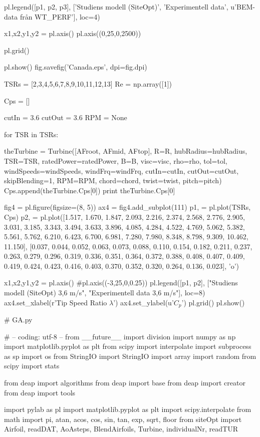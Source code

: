 \begin{pythoncode}
pl.legend([p1, p2, p3], ['Studiens modell (SiteOpt)', 'Experimentell data', u'BEM-data från WT_PERF'], loc=4)

x1,x2,y1,y2 = pl.axis()
pl.axis((0,25,0,2500))

pl.grid()


pl.show()
fig.savefig('Canada.eps', dpi=fig.dpi)


TSRs = [2,3,4,5,6,7,8,9,10,11,12,13] 
Re = np.array([1])

Cps = []

cutIn = 3.6
cutOut = 3.6
RPM = None

for TSR in TSRs:

	theTurbine = Turbine([AFroot, AFmid, AFtop], R=R, hubRadius=hubRadius, TSR=TSR, 
	                      ratedPower=ratedPower, B=B, visc=visc, rho=rho, tol=tol, 
	                      windSpeeds=windSpeeds, windFrq=windFrq, cutIn=cutIn, 
	                      cutOut=cutOut, skipBlending=1, RPM=RPM,
	                      chord=chord, twist=twist, pitch=pitch)
	Cps.append(theTurbine.Cps[0])
	print theTurbine.Cps[0]


fig4 = pl.figure(figsize=(8, 5))
ax4 = fig4.add_subplot(111)
p1, = pl.plot(TSRs, Cps)
p2, = pl.plot([1.517, 1.670, 1.847, 2.093, 2.216, 2.374, 2.568, 2.776, 2.905, 3.031, 3.185, 3.343, 3.494, 3.633, 3.896, 4.085, 4.284, 4.522, 4.769, 5.062, 5.382, 5.561, 5.762, 6.210, 6.423, 6.700, 6.981, 7.280, 7.980, 8.348, 8.798, 9.309, 10.462, 11.150], [0.037, 0.044, 0.052, 0.063, 0.073, 0.088, 0.110, 0.154, 0.182, 0.211, 0.237, 0.263, 0.279, 0.296, 0.319, 0.336, 0.351, 0.364, 0.372, 0.388, 0.408, 0.407, 0.409, 0.419, 0.424, 0.423, 0.416, 0.403, 0.370, 0.352, 0.320, 0.264, 0.136, 0.023], 'o')

x1,x2,y1,y2 = pl.axis()
#pl.axis((-3,25,0,0.25))
pl.legend([p1, p2], ["Studiens modell (SiteOpt) 3,6 m/s", "Experimentell data 3,6 m/s"], loc=8)
ax4.set_xlabel(r'Tip Speed Ratio $\lambda$')
ax4.set_ylabel(u'$C_p$')
pl.grid()
pl.show()




# GA.py

# -- coding: utf-8 --
from __future__ import division
import numpy as np
import matplotlib.pyplot as plt
from scipy import interpolate
import subprocess as sp
import os
from StringIO import StringIO
import array
import random
from scipy import stats

from deap import algorithms
from deap import base
from deap import creator
from deap import tools

import pylab as pl
import matplotlib.pyplot as plt
import scipy.interpolate
from math import pi, atan, acos, cos, sin, tan, exp, sqrt, floor
from siteOpt import Airfoil, readDAT, AoAsteps, BlendAirfoils, Turbine, individualNr, readTUR


\end{pythoncode}
